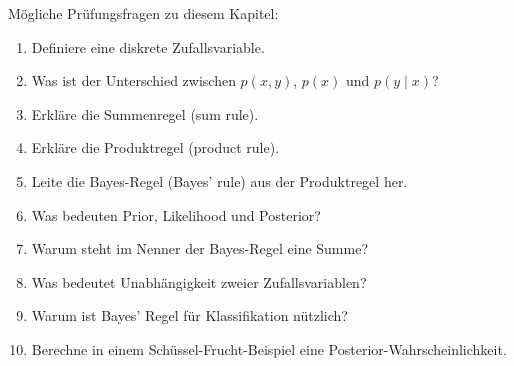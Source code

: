 \begin{examtipbox}
Mögliche Prüfungsfragen zu diesem Kapitel:

\begin{enumerate}
    \item Definiere eine diskrete Zufallsvariable.
    \item Was ist der Unterschied zwischen \(p(x,y)\), \(p(x)\) und \(p(y \mid x)\)?
    \item Erkläre die Summenregel (sum rule).
    \item Erkläre die Produktregel (product rule).
    \item Leite die Bayes-Regel (Bayes' rule) aus der Produktregel her.
    \item Was bedeuten Prior, Likelihood und Posterior?
    \item Warum steht im Nenner der Bayes-Regel eine Summe?
    \item Was bedeutet Unabhängigkeit zweier Zufallsvariablen?
    \item Warum ist Bayes' Regel für Klassifikation nützlich?
    \item Berechne in einem Schüssel-Frucht-Beispiel eine Posterior-Wahrscheinlichkeit.
\end{enumerate}
\end{examtipbox}